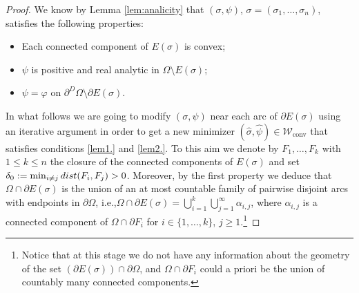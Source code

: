 \documentclass[11pt]{article}
\newcommand{\ie}{i.e.,\xspace}
\numberwithin{equation}{section}
\let\Om\Omega
\newcommand\admclassconv{{\mathcal W_\mathrm{conv}}}
\newcommand{\dist}{\textup{dist}}
\theoremstyle{definition}
\begin{document}
\begin{proof}

We know by Lemma \ref{lem:analicity} that $(\sigma,\psi)$, $\sigma=(\sigma_1,\dots,\sigma_n)$, satisfies the following properties:
\begin{itemize}
\item
Each connected component of $E(\sigma)$ is convex;
\item $\psi$ is positive and real analytic
in $\Om\setminus E(\sigma)$;
\item $\psi=\varphi$ on $\partial^D\Om\setminus\partial E(\sigma)$.
\end{itemize}

In what follows we are going to modify $(\sigma,\psi)$ near each arc of $\partial E(\sigma)$ using an iterative argument in order to get a new minimizer $(\widehat\sigma,\widehat\psi)\in\admclassconv$ that satisfies conditions \ref{lem1.} and \ref{lem2.}. To this aim we denote by $F_1,\dots,F_k$ with $1\le k\le n$ the closure of the connected components of $E(\sigma)$ and set
$ \delta_0:=\min_{i\ne j}\dist(F_i,F_j)>0$. Moreover, by the first property we deduce that $\Om\cap\partial E(\sigma)$ is the union of an at most countable family of pairwise disjoint arcs with endpoints in $\partial\Om$, \ie $\Om\cap \partial E(\sigma)=
\bigcup_{i=1}^k\bigcup_{j=1}^\infty \alpha_{i,j}$, where $\alpha_{i,j}$ is a connected component of $\Om\cap\partial F_i$ for $i\in\{1,
\dots,k\}$, $j\ge1$.\footnote{Notice that at this stage we do not have any information about the geometry of the set $(\partial E(\sigma))\cap \partial\Om$, and $\Om\cap\partial F_i$ could a priori be the union of countably many connected components.}


\end{proof}
\end{document}
